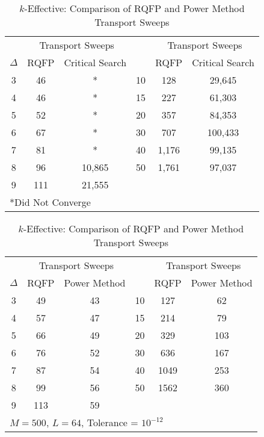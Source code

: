\begin{table}[!htbp]
	\caption{Transport Sweep Comparisons for Homogeneous Multiplying Spheres}
	\begin{subtable}[!htbp]{1.0\textwidth}
	\centering{}
	\begin{tabular}{@{}cccccc@{}}\toprule
	& \multicolumn{2}{c}{Transport Sweeps} & & \multicolumn{2}{c}{Transport Sweeps} \\
	\cmidrule{2-3} \cmidrule{5-6} $\Delta$ & RQFP & Critical Search \quad &  \Delta & RQFP & Critical Search\\
	\midrule
3 & 46 & * & 10 & 128 & 29,645 \\
4 & 46 & * & 15 & 227 & 61,303 \\
5 & 52 & * & 20 & 357 & 84,353 \\
6 & 67 & * & 30 & 707 & 100,433 \\
7 & 81 & * & 40 & 1,176 & 99,135 \\
8 & 96 & 10,865 & 50 & 1,761 & 97,037 \\
9 & 111 & 21,555 & & & \\ 
	\bottomrule%
	\multicolumn{6}{l}{*Did Not Converge} \\
	\end{tabular}
	\caption{Alpha-Eigenvalue: Comparison of RQFP and Critical Search Sweeps}
	\label{table:CompMultSweepsSphere}
	\end{subtable}%
	\vspace{0.25cm}
	\begin{subtable}[!htbp]{1.0\textwidth}
	\centering{}
	\begin{tabular}{@{}cccccc@{}}\toprule
	& \multicolumn{2}{c}{Transport Sweeps} & & \multicolumn{2}{c}{Transport Sweeps} \\
	\cmidrule{2-3} \cmidrule{5-6} $\Delta$ & RQFP & Power Method \quad &  \Delta & RQFP & Power Method\\
	\midrule
3 & 49 & 43 & 10 & 127 & 62 \\ 
4 & 57 & 47 & 15 & 214 & 79 \\
5 & 66 & 49 & 20 & 329 & 103 \\
6 & 76 & 52 & 30 & 636 & 167 \\ 
7 & 87 & 54 & 40 & 1049 & 253 \\ 
8 & 99 & 56 & 50 & 1562 & 360 \\ 
9 & 113 & 59 &  &  &  \\ 
	\bottomrule
	\multicolumn{6}{l}{$M = 500$, $L = 64$, Tolerance = $10^{-12}$} \\
	\end{tabular}
	\caption{$k$-Effective: Comparison of RQFP and Power Method Transport Sweeps}
	\label{table:CompMultSweepsKSphere}
	\end{subtable}
\end{table}

